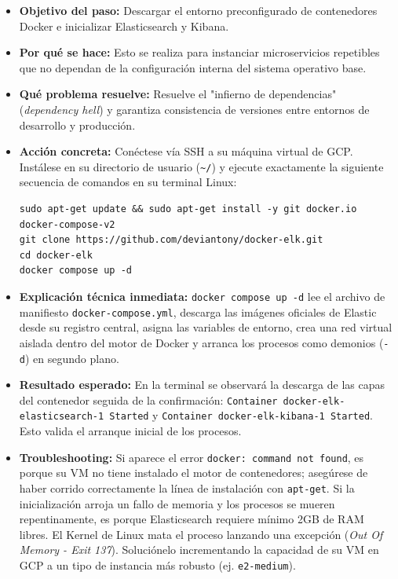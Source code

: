 \documentclass[
  coursetitle={Cómputo Nube y Tecnologías Emergentes},
  coursehours={96},
  coursedate={Verano 2026},
  doctype={Práctica},
  otherlangs={english,french},
  authorname={Lázaro},
  authorsurname={Bustio-Martínez},
  authortitle={PhD},
  role={Profesor Investigador},
  email={lbustio@inaoe.mx},
  phone={5559504000},
  ext={7459},
  institution={Instituto Nacional de Astrofísica, Óptica y Electrónica (INAOE)},
  department={Maestría en Ciencias en Tecnologías de Seguridad},
  address={Luis Enrique Erro 1, Sta. Ma. Tonantzintla, San Andrés Cholula, CP 72840, Puebla, México},
  margin={0.5in}
]{../../lbustio_lecture_notes}
\begin{document}
\begin{itemize}
    \item \textbf{Objetivo del paso:} Descargar el entorno preconfigurado de contenedores Docker e inicializar Elasticsearch y Kibana.
    \item \textbf{Por qué se hace:} Esto se realiza para instanciar microservicios repetibles que no dependan de la configuración interna del sistema operativo base.
    \item \textbf{Qué problema resuelve:} Resuelve el "infierno de dependencias" (\textit{dependency hell}) y garantiza consistencia de versiones entre entornos de desarrollo y producción.
    \item \textbf{Acción concreta:} Conéctese vía SSH a su máquina virtual de GCP. Instálese en su directorio de usuario (\texttt{\textasciitilde/}) y ejecute exactamente la siguiente secuencia de comandos en su terminal Linux:
    
\begin{verbatim}
sudo apt-get update && sudo apt-get install -y git docker.io docker-compose-v2
git clone https://github.com/deviantony/docker-elk.git
cd docker-elk
docker compose up -d
\end{verbatim}

    \item \textbf{Explicación técnica inmediata:} \texttt{docker compose up -d} lee el archivo de manifiesto \texttt{docker-compose.yml}, descarga las imágenes oficiales de Elastic desde su registro central, asigna las variables de entorno, crea una red virtual aislada dentro del motor de Docker y arranca los procesos como demonios (\texttt{-d}) en segundo plano.
    
    \item \textbf{Resultado esperado:} En la terminal se observará la descarga de las capas del contenedor seguida de la confirmación: \texttt{Container docker-elk-elasticsearch-1 Started} y \texttt{Container docker-elk-kibana-1 Started}. Esto valida el arranque inicial de los procesos.
    
    \item \textbf{Troubleshooting:} Si aparece el error \texttt{docker: command not found}, es porque su VM no tiene instalado el motor de contenedores; asegúrese de haber corrido correctamente la línea de instalación con \texttt{apt-get}. Si la inicialización arroja un fallo de memoria y los procesos se mueren repentinamente, es porque Elasticsearch requiere mínimo 2GB de RAM libres. El Kernel de Linux mata el proceso lanzando una excepción (\textit{Out Of Memory - Exit 137}). Soluciónelo incrementando la capacidad de su VM en GCP a un tipo de instancia más robusto (ej. \texttt{e2-medium}).
\end{itemize}
\end{document}
